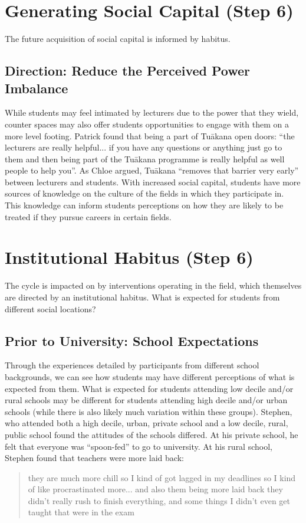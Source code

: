 \section{Generating Social Capital (Step 6)}
The future acquisition of social capital is informed by habitus.

\subsection{Direction: Reduce the Perceived Power Imbalance}
While students may feel intimated by lecturers due to the power that they wield, counter spaces may also offer students opportunities to engage with them on a more level footing. Patrick found that being a part of Tu\={a}kana open doors: ``the lecturers are really helpful... if you have any questions or anything just go to them and then being part of the Tu\={a}kana programme is really helpful as well people to help you''. As Chloe argued, Tu\={a}kana ``removes that barrier very early'' between lecturers and students. With increased social capital, students have more sources of knowledge on the culture of the fields in which they participate in. This knowledge can inform students perceptions on how they are likely to be treated if they pursue careers in certain fields. 


\section{Institutional Habitus (Step 6)}
The cycle is impacted on by interventions operating in the field, which themselves are directed by an institutional habitus. What is expected for students from different social locations?

\subsection{Prior to University: School Expectations}
Through the experiences detailed by participants from different school backgrounds, we can see how students may have different perceptions of what is expected from them. What is expected for students attending low decile and/or rural schools may be different for students attending high decile and/or urban schools (while there is also likely much variation within these groups). Stephen, who attended both a high decile, urban, private school and a low decile, rural, public school found the attitudes of the schools differed. At his private school, he felt that everyone was ``spoon-fed'' to go to university. At his rural school, Stephen found that  teachers were more laid back: \blockquote{they are much more chill so I kind of got lagged in my deadlines so I kind of like procrastinated more... and also them being more laid back they didn't really rush to finish everything, and some things I didn't even get taught that were in the exam}. 

